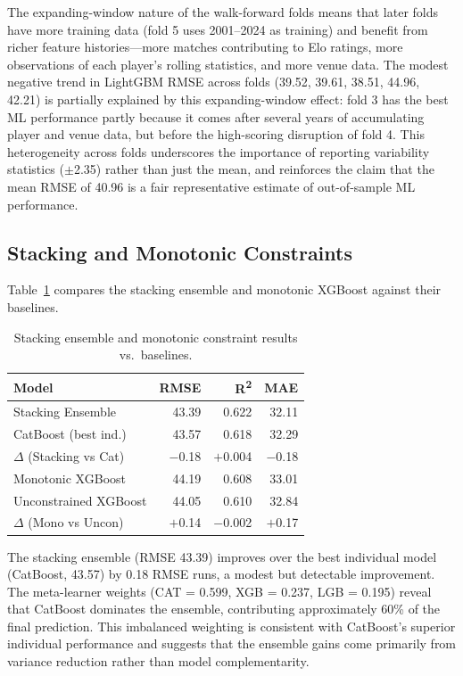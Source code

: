\documentclass[10pt,a4paper,twocolumn]{article}
\begin{document}
The expanding-window nature of the walk-forward folds means that later folds have more training data (fold 5 uses 2001--2024 as training) and benefit from richer feature histories---more matches contributing to Elo ratings, more observations of each player's rolling statistics, and more venue data. The modest negative trend in LightGBM RMSE across folds (39.52, 39.61, 38.51, 44.96, 42.21) is partially explained by this expanding-window effect: fold 3 has the best ML performance partly because it comes after several years of accumulating player and venue data, but before the high-scoring disruption of fold 4. This heterogeneity across folds underscores the importance of reporting variability statistics ($\pm$2.35) rather than just the mean, and reinforces the claim that the mean RMSE of 40.96 is a fair representative estimate of out-of-sample ML performance.

\subsection{Stacking and Monotonic Constraints}
\label{sec:stacking}

Table~\ref{tab:stacking} compares the stacking ensemble and monotonic XGBoost against their baselines.

\begin{table}[H]
\centering
\caption{Stacking ensemble and monotonic constraint results vs.\ baselines.}
\label{tab:stacking}
\small
\begin{tabular}{@{}lrrr@{}}
\toprule
\textbf{Model} & \textbf{RMSE} & \textbf{R\textsuperscript{2}} & \textbf{MAE} \\
\midrule
Stacking Ensemble      & 43.39 & 0.622 & 32.11 \\
CatBoost (best ind.) & 43.57 & 0.618 & 32.29 \\
$\Delta$ (Stacking vs Cat) & $-$0.18 & $+$0.004 & $-$0.18 \\
\midrule
Monotonic XGBoost      & 44.19 & 0.608 & 33.01 \\
Unconstrained XGBoost  & 44.05 & 0.610 & 32.84 \\
$\Delta$ (Mono vs Uncon) & $+$0.14 & $-$0.002 & $+$0.17 \\
\bottomrule
\end{tabular}
\end{table}

The stacking ensemble (RMSE 43.39) improves over the best individual model (CatBoost, 43.57) by 0.18 RMSE runs, a modest but detectable improvement. The meta-learner weights (CAT = 0.599, XGB = 0.237, LGB = 0.195) reveal that CatBoost dominates the ensemble, contributing approximately 60\% of the final prediction. This imbalanced weighting is consistent with CatBoost's superior individual performance and suggests that the ensemble gains come primarily from variance reduction rather than model complementarity.
\end{document}
